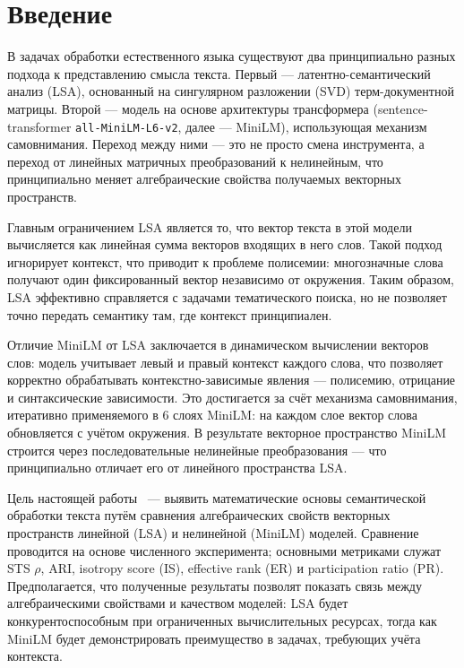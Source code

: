 \section{Введение}

В задачах обработки естественного языка существуют два принципиально
разных подхода к представлению смысла текста. Первый —
латентно-семантический анализ (LSA), основанный на сингулярном
разложении (SVD) терм-документной матрицы. Второй — модель на основе архитектуры
трансформера (sentence-transformer \texttt{all-MiniLM-L6-v2}, далее --- MiniLM),
использующая механизм самовнимания. Переход между ними --- это не
просто смена инструмента, а переход от линейных матричных
преобразований к нелинейным, что принципиально меняет алгебраические
свойства получаемых векторных пространств.

Главным ограничением LSA является то, что вектор текста в этой модели
вычисляется как линейная сумма векторов входящих в него слов. Такой
подход игнорирует контекст, что приводит к проблеме полисемии:
многозначные слова получают один фиксированный вектор независимо от
окружения. Таким образом, LSA эффективно справляется с задачами
тематического поиска, но не позволяет точно передать семантику там,
где контекст принципиален.

Отличие MiniLM от LSA заключается в динамическом вычислении векторов
слов: модель учитывает левый и правый контекст каждого слова, что
позволяет корректно обрабатывать контекстно-зависимые явления —
полисемию, отрицание и синтаксические зависимости. Это
достигается за счёт механизма самовнимания, итеративно применяемого в
6 слоях MiniLM: на каждом слое вектор слова обновляется с
учётом окружения. В результате векторное пространство MiniLM строится
через последовательные нелинейные преобразования — что принципиально
отличает его от линейного пространства LSA.

Цель настоящей работы ~--- выявить математические основы семантической
обработки текста путём сравнения алгебраических свойств векторных
пространств линейной (LSA) и нелинейной (MiniLM) моделей. Сравнение
проводится на основе численного эксперимента; основными метриками
служат STS $\rho$, ARI, isotropy score (IS), effective rank (ER) и
participation ratio (PR). Предполагается, что полученные результаты
позволят показать
связь между алгебраическими свойствами и качеством моделей: LSA будет
конкурентоспособным при ограниченных вычислительных ресурсах, тогда
как MiniLM будет демонстрировать преимущество в задачах, требующих
учёта контекста.
